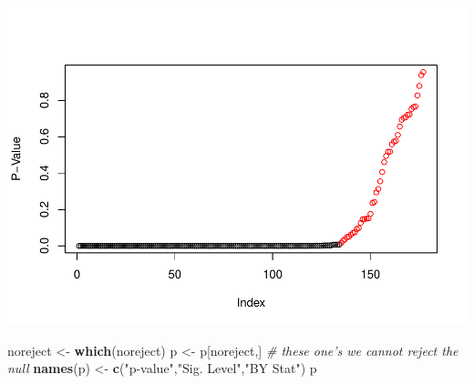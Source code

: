 \documentclass[
]{article}
\newenvironment{Shaded}{\begin{snugshade}}{\end{snugshade}}
\newcommand{\CommentTok}[1]{\textcolor[rgb]{0.56,0.35,0.01}{\textit{#1}}}
\newcommand{\KeywordTok}[1]{\textcolor[rgb]{0.13,0.29,0.53}{\textbf{#1}}}
\newcommand{\NormalTok}[1]{#1}
\newcommand{\StringTok}[1]{\textcolor[rgb]{0.31,0.60,0.02}{#1}}
\begin{document}
\includegraphics{dlassoMarkdown_files/figure-latex/unnamed-chunk-3-1.pdf}

\begin{Shaded}
\begin{Highlighting}[]
\NormalTok{noreject <-}\StringTok{ }\KeywordTok{which}\NormalTok{(noreject)}
\NormalTok{p <-}\StringTok{ }\NormalTok{p[noreject,]   }\CommentTok{# these one's we cannot reject the null}
\KeywordTok{names}\NormalTok{(p) <-}\StringTok{ }\KeywordTok{c}\NormalTok{(}\StringTok{"p-value"}\NormalTok{,}\StringTok{"Sig. Level"}\NormalTok{,}\StringTok{"BY Stat"}\NormalTok{)}
\NormalTok{p}
\end{Highlighting}
\end{Shaded}
\end{document}
